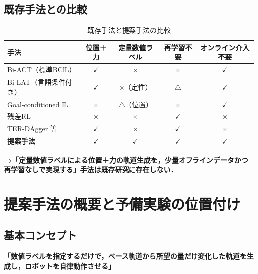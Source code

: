 \documentclass[a4paper,10pt]{jlreq}
\newcommand{\figph}[2][0.72\linewidth]{%
  \begin{center}
    \fboxsep=6pt
    \fbox{\begin{minipage}{#1}%
      \centering\vspace{1.4cm}%
      \textcolor{gray}{\small [図：#2]}%
      \vspace{1.4cm}%
    \end{minipage}}
  \end{center}%
}
\begin{document}
\subsection{既存手法との比較}

\begin{table}[h]
  \centering\small
  \caption{既存手法と提案手法の比較}
  \begin{tabularx}{\linewidth}{Xcccc}
    \toprule
    手法 & 位置＋力 & 定量数値ラベル & 再学習不要 & オンライン介入不要 \\
    \midrule
    Bi-ACT（標準BCIL）   & $\checkmark$ & $\times$         & $\times$         & $\checkmark$ \\
    Bi-LAT（言語条件付き） & $\checkmark$ & $\times$（定性）  & $\triangle$      & $\checkmark$ \\
    Goal-conditioned IL  & $\times$     & $\triangle$（位置）& $\times$         & $\checkmark$ \\
    残差RL               & $\times$     & $\times$         & $\checkmark$     & $\times$     \\
    TER-DAgger 等        & $\checkmark$ & $\times$         & $\checkmark$     & $\times$     \\
    \textbf{提案手法}    & $\checkmark$ & $\checkmark$     & $\checkmark$     & $\checkmark$ \\
    \bottomrule
  \end{tabularx}
\end{table}

\noindent\textbf{→「定量数値ラベルによる位置＋力の軌道生成を，少量オフラインデータかつ再学習なしで実現する」手法は既存研究に存在しない．}

\clearpage

\section{提案手法の概要と予備実験の位置付け}

\subsection{基本コンセプト}

\begin{center}
  \textbf{「数値ラベルを指定するだけで，ベース軌道から所望の量だけ変化した軌道を生成し，ロボットを自律動作させる」}
\end{center}

\figph[0.88\linewidth]{提案手法の全体フロー（Motion Retouch によるデータ収集 → 残差NN学習 → ILCによる反復収束）}
\end{document}
